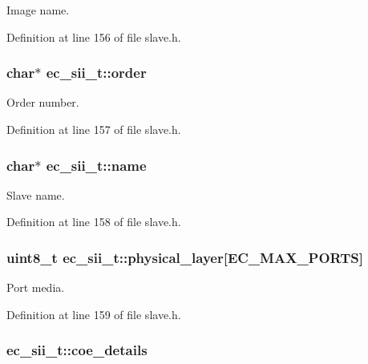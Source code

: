 \-Image name. 



\-Definition at line 156 of file slave.\-h.

\subsubsection[{order}]{\setlength{\rightskip}{0pt plus 5cm}char$\ast$ {\bf ec\-\_\-sii\-\_\-t\-::order}}\label{structec__sii__t_a26e505154880d387b75d4d9f52181223}


\-Order number. 



\-Definition at line 157 of file slave.\-h.

\subsubsection[{name}]{\setlength{\rightskip}{0pt plus 5cm}char$\ast$ {\bf ec\-\_\-sii\-\_\-t\-::name}}\label{structec__sii__t_ae4a7f50f715570d1cbfce538ab7828d9}


\-Slave name. 



\-Definition at line 158 of file slave.\-h.

\subsubsection[{physical\-\_\-layer}]{\setlength{\rightskip}{0pt plus 5cm}uint8\-\_\-t {\bf ec\-\_\-sii\-\_\-t\-::physical\-\_\-layer}[{\bf \-E\-C\-\_\-\-M\-A\-X\-\_\-\-P\-O\-R\-T\-S}]}\label{structec__sii__t_afa995764cc295a2de209b27f2ac07f85}


\-Port media. 



\-Definition at line 159 of file slave.\-h.

\subsubsection[{coe\-\_\-details}]{ {\bf ec\-\_\-sii\-\_\-t\-::coe\-\_\-details}}\label{structec__sii__t_a7896df4d79afdb971b9817d41fbb847e}


